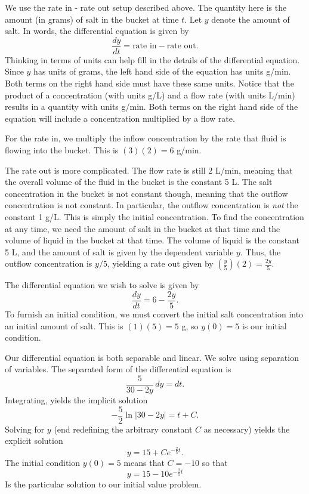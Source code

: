 {We use the rate in - rate out setup described above.  The quantity here is the amount (in grams) of salt in the bucket at time $t$.  Let $y$ denote the amount of salt.  In words, the differential equation is given by
	\[
		\frac{dy}{dt} = \text{rate in} - \text{rate out}.
	\]
Thinking in terms of units can help fill in the details of the differential equation.  Since $y$ has units of grams, the left hand side of the equation has units g/min.  Both terms on the right hand side must have these same units.  Notice that the product of a concentration (with units g/L) and a flow rate (with units L/min) results in a quantity with units g/min.  Both terms on the right hand side of the equation will include a concentration multiplied by a flow rate.

For the rate in, we multiply the inflow concentration by the rate that fluid is flowing into the bucket.  This is $(3)(2) = 6$ g/min.

The rate out is more complicated.  The flow rate is still 2 L/min, meaning that the overall volume of the fluid in the bucket is the constant 5 L.  The salt concentration in the bucket is not constant though, meaning that the outflow concentration is not constant.  In particular, the outflow concentration is \emph{not} the constant 1 g/L.  This is simply the initial concentration.  To find the concentration at any time, we need the amount of salt in the bucket at that time and the volume of liquid in the bucket at that time.  The volume of liquid is the constant 5 L, and the amount of salt is given by the dependent variable $y$.  Thus, the outflow concentration is $y/5$, yielding a rate out given by $\left(\frac{y}{5}\right)(2) = \frac{2y}{5}.$

The differential equation we wish to solve is given by
	\[
		\frac{dy}{dt} = 6 - \frac{2y}{5}.
	\]
To furnish an initial condition, we must convert the initial salt concentration into an initial amount of salt.  This is $(1)(5) = 5$ g, so $y(0) = 5$ is our initial condition.

Our differential equation is both separable and linear.  We solve using separation of variables.  The separated form of the differential equation is
	\[
		\frac{5}{30 - 2y}\,dy = dt.
	\]
Integrating, yields the implicit solution
	\[
		-\frac{5}{2}\ln|30 - 2y| = t+C.
	\]
Solving for $y$ (end redefining the arbitrary constant $C$ as necessary) yields the explicit solution
	\[
		y = 15 + Ce^{-\frac{2}{5}t}.
	\]
The initial condition $y(0) = 5$ means that $C = -10$ so that
	\[
		y = 15 - 10e^{-\frac{2}{5}t}
	\]
Is the particular solution to our initial value problem.

}
